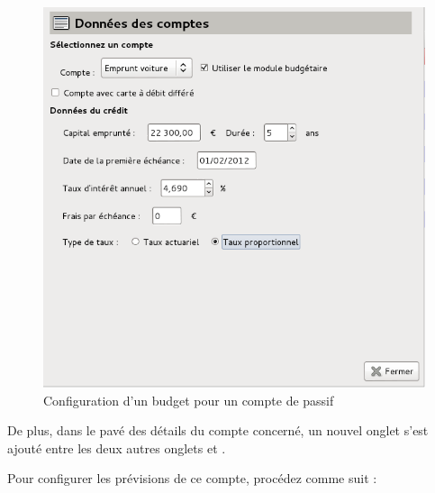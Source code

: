 \ifIllustration
\begin{figure}[ht]
\begin{center}
\includegraphics[scale=0.5]{image/screenshot/setup_budget_dataLiability}
\end{center}
\caption{Configuration d'un budget pour un compte de passif}
\label{setup_budget_dataLiability-img}
\end{figure}
\fi

De plus, dans le pavé des détails du compte concerné, un nouvel onglet  s'est ajouté entre les deux autres onglets  et .

Pour configurer les prévisions de ce compte, procédez comme suit :

